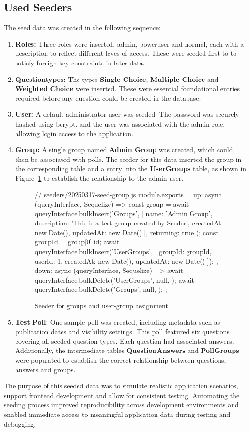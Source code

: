 \documentclass[a4paper,12pt]{report}
\begin{document}
\subsection{Used Seeders}
The seed data was created in the following sequence:
\begin{enumerate}
	\item \textbf{Roles:} Three roles were inserted, admin, poweruser and normal, each with a description to reflect different leves of access. These were seeded first to to satisfy foreign key constraints in later data.
	\item \textbf{Questiontypes:} The types \textbf{Single Choice}, \textbf{Multiple Choice} and \textbf{Weighted Choice} were inserted. These were essential foundational entries required before any question could be created in the database. 
	\item \textbf{User:} A default administrator user was seeded. The password was securely hashed using bcrypt. and the user was associated with the admin role, allowing login access to the application.
	\item \textbf{Group:} A single group named \textbf{Admin Group} was created, which could then be associated with polls. The seeder for this data inserted the group in the corresponding table and a entry into the \textbf{UserGroups} table, as shown in Figure~\ref{fig:group_seeder} to establish the relationship to the admin user.
	\begin{figure}[H]
	\begin{code}
	// seeders/20250317-seed-group.js
	module.exports = {
	up: async (queryInterface, Sequelize) => {
		const group = await queryInterface.bulkInsert('Groups', [{
		name: 'Admin Group',
		description: 'This is a test group created by Seeder',
		createdAt: new Date(),
		updatedAt: new Date()
		}], { returning: true });
		const groupId = group[0].id;
		await queryInterface.bulkInsert('UserGroups', [{
		groupId: groupId,
		userId: 1,
		createdAt: new Date(),
		updatedAt: new Date()
		}]);
	},
	down: async (queryInterface, Sequelize) => {
		await queryInterface.bulkDelete('UserGroups', null, {});
		await queryInterface.bulkDelete('Groups', null, {});
	}
	};
	\end{code}
	\caption{Seeder for groups and user-group assignment}
	\label{fig:group_seeder}
	\end{figure}
	\item \textbf{Test Poll:} One sample poll was created, including metadata such as publication dates and visibility settings. This poll featured six questions covering all seeded question types. Each question had associated answers. Additionally, the intermediate tables \textbf{QuestionAnswers} and \textbf{PollGroups} were populated to establish the correct relationship between questions, answers and groups.
\end{enumerate}
The purpose of this seeded data was to simulate realistic application scenarios, support frontend development and allow for consistent testing. Automating the seeding process improved reproducibility across development environments and enabled immediate access to meaningful application data during testing and debugging.
\end{document}
